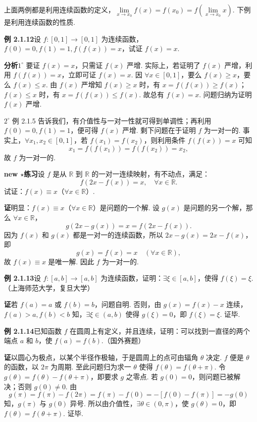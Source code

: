 \documentclass[UTF8, 12pt, fontset=fandol, oneside]{ctexart}
\begin{document}
上面两例都是利用连续函数的定义，$\lim\limits_{x\to x_0}f(x)=f(x_0)=f(\lim\limits_{x\to x_0}x)$. 下例是利用连续函数的性质.

\noindent\textbf{例 2.1.12}\quad 设 $f:[0,1]\to[0,1]$ 为连续函数，$f(0)=0,f(1)=1,f(f(x))=x$，试证 $f(x)=x$.

\noindent\textbf{分析}\quad $1^\circ$ 要证 $f(x)=x$，只需证 $f(x)$ 严增. 实际上，若证明了 $f(x)$ 严增，利用 $f(f(x))=x$，立即可证 $f(x)=x$. 因 $\forall x\in[0,1]$，要么 $f(x)\ge x$，要么 $f(x)\le x$. 由 $f(x)$ 严增知 $f(x)\ge x$ 时，有 $x=f(f(x))\ge f(x)$；$f(x)\le x$ 时，有 $x=f(f(x))\le f(x)$. 故总有 $f(x)=x$. 问题归纳为证明 $f(x)$ 严增.

$2^\circ$ 例 2.1.5 告诉我们，有介值性与一对一性就可得到单调性；再利用 $f(0)=0,f(1)=1$，便可得 $f(x)$ 严增. 剩下问题在于证明 $f$ 为一对一的. 事实上，$\forall x_1,x_2\in[0,1]$，若 $f(x_1)=f(x_2)$，则利用条件 $f(f(x))=x$ 可知
\[
  x_1=f(f(x_1))=f(f(x_2))=x_2,
\]
故 $f$ 为一对一的.

\noindent\textbf{new $\star$练习}\quad 设 $f$ 是从 $\mathbb{R}$ 到 $\mathbb{R}$ 的一对一连续映射，有不动点，满足：
\[
  f(2x-f(x))=x,\quad \forall x\in\mathbb{R}.
\]
试证：$f(x)\equiv x$（$\forall x\in\mathbb{R}$）.

\noindent\textbf{证}\quad 明显：$f(x)\equiv x$（$\forall x\in\mathbb{R}$）是问题的一个解. 设 $g(x)$ 是问题的另一个解，那么 $\forall x\in\mathbb{R}$，
\[
  g(2x-g(x))=x=f(2x-f(x)).
\]
因为 $f(x)$ 和 $g(x)$ 都是一对一的连续函数，所以 $2x-g(x)=2x-f(x)$，即
\[
  g(x)=f(x)=x\quad(\forall x\in\mathbb{R}),
\]
故 $f(x)\equiv x$ 是唯一解. 因此 $f$ 为一对一的.

\noindent\textbf{例 2.1.13}\quad 设 $f:[a,b]\to[a,b]$ 为连续函数，证明：$\exists\xi\in[a,b]$，使得 $f(\xi)=\xi$.（上海师范大学，复旦大学）

\noindent\textbf{证}\quad 若 $f(a)=a$ 或 $f(b)=b$，问题自明. 否则，由 $g(x)=f(x)-x$ 连续，$f(a)>a,f(b)<b$ 知，$\exists\xi\in(a,b)$ 使得 $g(\xi)=0$，即 $f(\xi)=\xi$. 证毕.

\noindent\textbf{例 2.1.14}\quad 已知函数 $f$ 在圆周上有定义，并且连续，证明：可以找到一直径的两个端点 $a$ 和 $b$，使 $f(a)=f(b)$.（国外赛题）

\noindent\textbf{证}\quad 以圆心为极点，以某个半径作极轴，于是圆周上的点可由辐角 $\theta$ 决定. $f$ 便是 $\theta$ 的函数，以 $2\pi$ 为周期. 至此问题归为求一 $\theta$ 使得 $f(\theta)=f(\theta+\pi)$. 令 $g(\theta)=f(\theta)-f(\theta+\pi)$，即要求 $g$ 之零点. 若 $g(0)=0$，则问题已被解决；否则 $g(0)\ne0$. 由
\[
  g(\pi)=f(\pi)-f(2\pi)=f(\pi)-f(0)=-[f(0)-f(\pi)]=-g(0)
\]
知，$g(\pi)$ 与 $g(0)$ 异号. 所以由介值性，$\exists\theta\in(0,\pi)$，使 $g(\theta)=0$，即 $f(\theta)=f(\theta+\pi)$. 证毕.
\end{document}
